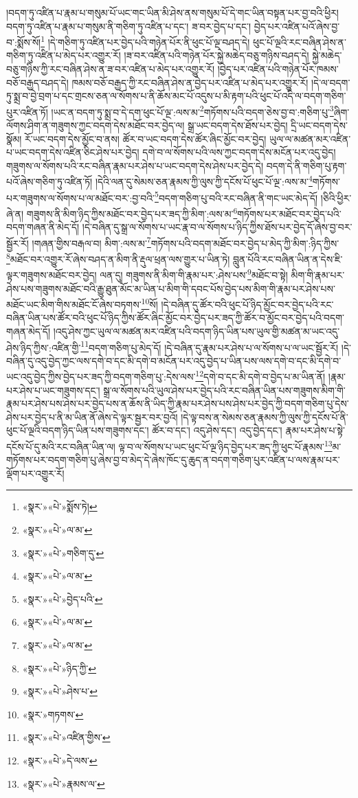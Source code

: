 །བདག་ཏུ་འཛིན་པ་རྣམ་པ་གསུམ་པོ་ཡང་གང་ཡིན་མི་ཤེས་ནས་གསུམ་པོ་དེ་གང་ཡིན་བསྟན་པར་བྱ་བའི་ཕྱིར། བདག་ཏུ་འཛིན་པ་རྣམ་པ་གསུམ་ནི་གཅིག་ཏུ་འཛིན་པ་དང་། ཟ་བར་བྱེད་པ་དང་། བྱེད་པར་འཛིན་པའོ་ཞེས་བྱ་བ་:སྨོས་སོ།\footnote{«སྣར་»«པེ་»སྨོས་ཏེ།} །དེ་གཅིག་ཏུ་འཛིན་པར་བྱེད་པའི་གཉེན་པོར་ནི་ཕུང་པོ་ལྔ་བཤད་དེ། ཕུང་པོ་ལྔའི་རང་བཞིན་ཤེས་ན་གཅིག་ཏུ་འཛིན་པ་མེད་པར་འགྱུར་རོ། །ཟ་བར་འཛིན་པའི་གཉེན་པོར་སྐྱེ་མཆེད་བཅུ་གཉིས་བཤད་དེ། སྐྱེ་མཆེད་བཅུ་གཉིས་ཀྱི་རང་བཞིན་ཤེས་ན་ཟ་བར་འཛིན་པ་མེད་པར་འགྱུར་རོ། །བྱེད་པར་འཛིན་པའི་གཉེན་པོར་ཁམས་བཅོ་བརྒྱད་བཤད་དེ། ཁམས་བཅོ་བརྒྱད་ཀྱི་རང་བཞིན་ཤེས་ན་བྱེད་པར་འཛིན་པ་མེད་པར་འགྱུར་རོ། །དེ་ལ་བདག་ཏུ་སྨྲ་བ་བྱེ་བྲག་པ་དང་གྲངས་ཅན་ལ་སོགས་པ་ནི་ཆོས་མང་པོ་འདུས་པ་མི་རྟག་པའི་ཕུང་པོ་འདི་ལ་བདག་གཅིག་པུར་འཛིན་ཏོ། །ཡང་ན་བདག་ཏུ་སྨྲ་བ་དེ་དག་ཕུང་པོ་ལྔ་:ལས་མ་\footnote{«སྣར་»«པེ་»ལ་མ་}གཏོགས་པའི་བདག་ཅེས་བྱ་བ་:གཅིག་པུ་\footnote{«སྣར་»«པེ་»གཅིག་དུ་}ཞིག་ལོགས་ཤིག་ན་གཟུགས་ཀྱང་བདག་དེས་མཐོང་བར་བྱེད་ལ། སྒྲ་ཡང་བདག་དེས་ཐོས་པར་བྱེད། དྲི་ཡང་བདག་དེས་སྣོམ། རོ་ཡང་བདག་དེས་མྱོང་བ་ནས། ཚོར་བ་ཡང་བདག་དེས་ཚོར་ཞིང་མྱོང་བར་བྱེད། ཡུལ་ལ་མཚན་མར་འཛིན་པ་ཡང་བདག་དེས་འཛིན་ཅིང་ཤེས་པར་བྱེད། དགེ་བ་ལ་སོགས་པའི་ལས་ཀྱང་བདག་དེས་མངོན་པར་འདུ་བྱེད། གཟུགས་ལ་སོགས་པའི་རང་བཞིན་རྣམ་པར་ཤེས་པ་ཡང་བདག་དེས་ཤེས་པར་བྱེད་དེ། བདག་དེ་ནི་གཅིག་པུ་རྟག་པའོ་ཞེས་གཅིག་ཏུ་འཛིན་ཏོ། །དེའི་ལན་དུ་སེམས་ཅན་རྣམས་ཀྱི་ལུས་ཀྱི་དངོས་པོ་ཕུང་པོ་ལྔ་:ལས་མ་\footnote{«སྣར་»«པེ་»ལ་མ་}གཏོགས་པར་གཟུགས་ལ་སོགས་པ་ལ་མཐོང་བར་:བྱ་བའི་\footnote{«སྣར་»«པེ་»བྱེད་པའི་}བདག་གཅིག་པུ་བའི་རང་བཞིན་ནི་གང་ཡང་མེད་དོ། །ཅིའི་ཕྱིར་ཞེ་ན། གཟུགས་ནི་མིག་ཉིད་ཀྱིས་མཐོང་བར་བྱེད་པར་ཟད་ཀྱི་མིག་:ལས་མ་\footnote{«སྣར་»«པེ་»ལ་མ་}གཏོགས་པར་མཐོང་བར་བྱེད་པའི་བདག་གཞན་ནི་མེད་དོ། །དེ་བཞིན་དུ་སྒྲ་ལ་སོགས་པ་ཡང་རྣ་བ་ལ་སོགས་པ་ཉིད་ཀྱིས་ཐོས་པར་བྱེད་དོ་ཞེས་བྱ་བར་སྦྱོར་རོ། །གཞན་གྱིས་བརྒལ་བ། མིག་:ལས་མ་\footnote{«སྣར་»«པེ་»ལ་མ་}གཏོགས་པའི་བདག་མཐོང་བར་བྱེད་པ་མེད་ཀྱི་མིག་:ཉིད་ཀྱིས་\footnote{«སྣར་»«པེ་»ཉིད་ཀྱི་}མཐོང་བར་འགྱུར་རོ་ཞེས་བཤད་ན་མིག་ནི་རྡུལ་ཕྲན་ལས་གྱུར་པ་ཡིན་ཏེ། བླུན་པོའི་རང་བཞིན་ཡིན་ན་དེས་ཇི་ལྟར་གཟུགས་མཐོང་བར་བྱེད། ལན་དུ། གཟུགས་ནི་མིག་གི་རྣམ་པར་:ཤེས་པས་\footnote{«སྣར་»«པེ་»ཤེས་པ་}མཐོང་བ་སྟེ། མིག་གི་རྣམ་པར་ཤེས་པས་གཟུགས་མཐོང་བའི་རྒྱུ་ཐུན་མོང་མ་ཡིན་པ་མིག་གི་དབང་པོས་བྱེད་པས་མིག་གི་རྣམ་པར་ཤེས་པས་མཐོང་ཡང་མིག་གིས་མཐོང་ངོ་ཞེས་བཏགས་\footnote{«སྣར་»གཏགས་}སོ། །དེ་བཞིན་དུ་ཚོར་བའི་ཕུང་པོ་ཉིད་མྱོང་བར་བྱེད་པའི་རང་བཞིན་ཡིན་པས་ཚོར་བའི་ཕུང་པོ་ཉིད་ཀྱིས་ཚོར་ཞིང་མྱོང་བར་བྱེད་པར་ཟད་ཀྱི་ཚོར་བ་མྱོང་བར་བྱེད་པའི་བདག་གཞན་མེད་དོ། །འདུ་ཤེས་ཀྱང་ཡུལ་ལ་མཚན་མར་འཛིན་པའི་བདག་ཉིད་ཡིན་པས་ཡུལ་གྱི་མཚན་མ་ཡང་འདུ་ཤེས་ཉིད་ཀྱིས་:འཛིན་གྱི་\footnote{«སྣར་»«པེ་»འཛིན་གྱིས་}བདག་གཅིག་པུ་མེད་དོ། །དེ་བཞིན་དུ་རྣམ་པར་ཤེས་པ་ལ་སོགས་པ་ལ་ཡང་སྦྱོར་རོ། །དེ་བཞིན་དུ་འདུ་བྱེད་ཀྱང་ལས་དགེ་བ་དང་མི་དགེ་བ་མངོན་པར་འདུ་བྱེད་པ་ཡིན་པས་ལས་དགེ་བ་དང་མི་དགེ་བ་ཡང་འདུ་བྱེད་ཀྱིས་བྱེད་པར་ཟད་ཀྱི་བདག་གཅིག་པུ་:དེས་ལས་\footnote{«སྣར་»«པེ་»དེ་ལས་}དགེ་བ་དང་མི་དགེ་བ་བྱེད་པ་མ་ཡིན་ནོ། །རྣམ་པར་ཤེས་པ་ཡང་གཟུགས་དང་། སྒྲ་ལ་སོགས་པའི་ཡུལ་ཤེས་པར་བྱེད་པའི་རང་བཞིན་ཡིན་པས་གཟུགས་མིག་གི་རྣམ་པར་ཤེས་པས་ཤེས་པར་བྱེད་པས་ན་ཆོས་ནི་ཡིད་ཀྱི་རྣམ་པར་ཤེས་པས་ཤེས་པར་བྱེད་ཀྱི་བདག་གཅིག་པུ་དེས་ཤེས་པར་བྱེད་པ་ནི་མ་ཡིན་ནོ་ཞེས་དེ་ལྟར་སྦྱར་བར་བྱའོ། །དེ་ལྟ་བས་ན་སེམས་ཅན་རྣམས་ཀྱི་ལུས་ཀྱི་དངོས་པོ་ནི་ཕུང་པོ་ལྔའི་བདག་ཉིད་ཡིན་པས་གཟུགས་དང་། ཚོར་བ་དང་། འདུ་ཤེས་དང་། འདུ་བྱེད་དང་། རྣམ་པར་ཤེས་པ་སྟེ་དངོས་པོ་དུ་མའི་རང་བཞིན་ཡིན་ལ། ལྟ་བ་ལ་སོགས་པ་ཡང་ཕུང་པོ་ལྔ་ཉིད་བྱེད་པར་ཟད་ཀྱི་ཕུང་པོ་རྣམས་\footnote{«སྣར་»«པེ་»རྣམས་ལ་}མ་གཏོགས་པར་བདག་གཅིག་པུ་ཞེས་བྱ་བ་མེད་དེ་ཞེས་ཁོང་དུ་ཆུད་ན་བདག་གཅིག་པུར་འཛིན་པ་ལས་རྣམ་པར་ལྡོག་པར་འགྱུར་རོ། 